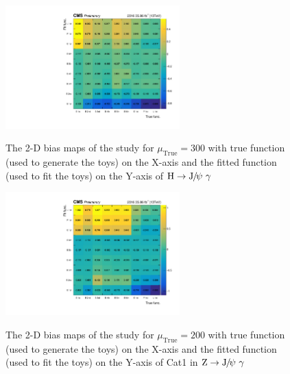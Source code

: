 		\begin{figure}[!ht]
		    \centering
		    \includegraphics[width=0.6\textwidth]{Fig/BiasStudy/BiasTable/HJpsiG/BiasTable_mu300}\\
		    \caption[BiasTable]{\label{fig:BiasTable_hjpsig}
		     The 2-D bias maps of the study for $\mu_{\text{True}}=300$ with true function (used to generate the toys) on the X-axis and the fitted function (used to fit the toys) on the Y-axis of $\mathrm{H}\to{\mathrm{J}\hspace{-.08em}/\hspace{-.14em}\psi}\ \gamma$}
		\end{figure}
		
		\begin{figure}[!ht]
		    \centering
		    \includegraphics[width=0.6\textwidth]{Fig/BiasStudy/BiasTable/ZJpsiG_Cat1/BiasTable_mu200}\\
		    \caption[BiasTable]{\label{fig:BiasTable_zjpsig_Cat1}
		     The 2-D bias maps of the study for $\mu_{\text{True}}=200$ with true function (used to generate the toys) on the X-axis and the fitted function (used to fit the toys) on the Y-axis of Cat1 in $\mathrm{Z}\to{\mathrm{J}\hspace{-.08em}/\hspace{-.14em}\psi}\ \gamma$}
		\end{figure}
		
